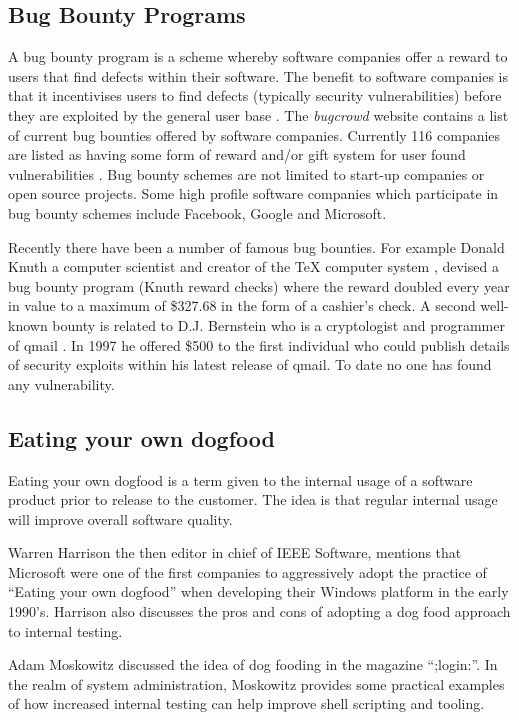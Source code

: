 \subsection{Bug Bounty Programs}
A bug bounty program is a scheme whereby software companies offer a reward to users that find defects within their software. The benefit to software companies is that it incentivises users to find defects (typically security vulnerabilities) before they are exploited by the general user base \cite{wiki2015bugbounty}. The \emph{bugcrowd} website contains a list of current bug bounties offered by software companies.  Currently 116 companies are listed as having some form of reward and/or gift system for user found vulnerabilities \cite{bugcrowd2015}. Bug bounty schemes are not limited to start-up companies or open source projects.  Some high profile software companies which participate in bug bounty schemes include Facebook, Google and Microsoft. \par

Recently there have been a number of famous bug bounties. For example Donald Knuth a computer scientist and creator of the TeX computer system \cite{Knuth2015}, devised a bug bounty program (Knuth reward checks) where the reward doubled every year in value to a maximum of  \$327.68 in the form of a cashier's check. A second well-known bounty is related to D.J. Bernstein who is a cryptologist and programmer of qmail \cite{Bernstein2015}. In 1997 he offered \$500 to the first individual who could publish details of security exploits within his latest release of qmail. To date no one has found any vulnerability.

\subsection{Eating your own dogfood}

Eating your own dogfood is a term given to the internal usage of a software product prior to release to the customer. The idea is that regular internal usage will improve overall software quality. 

Warren Harrison \cite{harrison2006eating} the then editor in chief of IEEE Software, mentions that Microsoft were one of the first companies to aggressively adopt the practice of ``Eating your own dogfood'' when developing their Windows platform in the early 1990's. Harrison also discusses the pros and cons of adopting a dog food approach to internal testing.

Adam Moskowitz \cite{moskowitz2003eat} discussed the idea of dog fooding in the magazine ``;login:''.  In the realm of system administration, Moskowitz provides some practical examples of how increased internal testing can help improve shell scripting and tooling.


